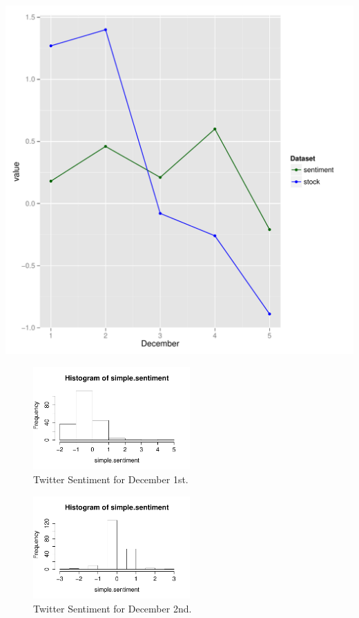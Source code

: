 \documentclass{article}\usepackage[]{graphicx}\usepackage[]{color}
\makeatletter
\def\maxwidth{ %
  \ifdim\Gin@nat@width>\linewidth
    \linewidth
  \else
    \Gin@nat@width
  \fi
}
\newenvironment{knitrout}{}{} %
\makeatother
\begin{document}
\begin{knitrout}
\color{fgcolor}
\includegraphics[width=\maxwidth]{figure/unnamed-chunk-1-1} 

\end{knitrout}


\begin{figure}[h!]
\caption{Twitter Sentiment for December 1st.}
\includegraphics[width=6cm]{12-1.pdf}
\centering
\end{figure}

\begin{figure}[h!]
\caption{Twitter Sentiment for December 2nd.}
\includegraphics[width=6cm]{12-2.pdf}
\centering
\end{figure}
\end{document}
